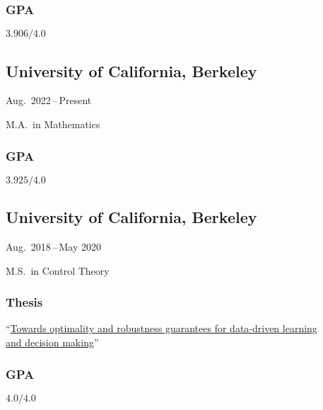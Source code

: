 \documentclass[11pt]{article}
\newcommand{\sectionwidth}{1in}		%
\newcommand{\subsectionskip}{\baselineskip}	%
\newcommand{\cvdates}[2]{\hfill#1\,--\,#2}	%
\begin{document}
	\begin{gpa-on}
		\subsubsection{GPA}
		$3.906/4.0$
	\end{gpa-on}
	
	\vspace*{\subsectionskip}

	\subsection{University of California, Berkeley}
	\cvdates{Aug.\ 2022}{Present}

	\hspace*{\sectionwidth}M.A.\ in Mathematics

	\begin{gpa-on}
		\subsubsection{GPA}
		$3.925/4.0$
	\end{gpa-on}

	\vspace*{\subsectionskip}
	
	\subsection{University of California, Berkeley}
	\cvdates{Aug.\ 2018}{May 2020}
	
	\hspace*{\sectionwidth}M.S.\ in Control Theory
	
	\subsubsection{Thesis}
	``\href{https://brendon-anderson.github.io/files/publications/ms_thesis.pdf}{Towards optimality and robustness guarantees for data-driven learning \\
	\hspace*{\sectionwidth}and decision making}''
	
	\begin{gpa-on}
		\subsubsection{GPA}
		$4.0/4.0$
	\end{gpa-on}
	
	\vspace*{\subsectionskip}
	
\end{document}
